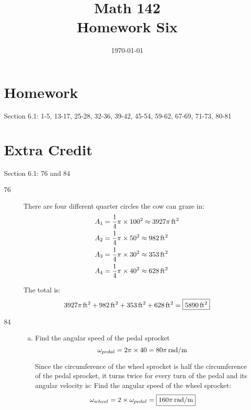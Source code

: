\documentclass{exam}
\author{}
\date{\today}
\title{Math 142 \\ Homework Six}
\begin{document}
  \maketitle

  \section{Homework}
  Section 6.1: 1-5, 13-17, 25-28, 32-36, 39-42, 45-54, 59-62, 67-69, 71-73, 80-81

  \section{Extra Credit}
  Section 6.1: 76 and 84

  \ifprintanswers

    \begin{description}
      \item[76]
        There are four different quarter circles the cow can graze in:
        \begin{align*}
          A_1 &= \frac{1}{4} \pi \times 100^2 \approx \unit[3927 \pi]{ft^2} \\
          A_2 &= \frac{1}{4} \pi \times 50^2 \approx \unit[982]{ft^2} \\
          A_3 &= \frac{1}{4} \pi \times 30^2 \approx \unit[353]{ft^2} \\
          A_4 &= \frac{1}{4} \pi \times 40^2 \approx \unit[628]{ft^2} \\
        \end{align*}

        The total is:
        \[
          \unit[3927 \pi]{ft^2} + \unit[982]{ft^2} + \unit[353]{ft^2} + \unit[628]{ft^2} = \boxed{ \unit[5890]{ft^2} }
        \]
        
      \item[84]
        \begin{enumerate}[(a)]

          \item 
            Find the angular speed of the pedal sprocket
            \[
              \omega_{pedal} = 2 \pi \times 40 = \unit[80 \pi]{rad/m}
            \]

            Since the circumference of the wheel sprocket is half the circumference of the pedal sprocket, it turns
            twice for every turn of the pedal and its angular velocity is:
            Find the angular speed of the wheel sprocket:
            \[
              \omega_{wheel} = 2 \times \omega_{pedal} = \boxed{ \unit[160 \pi]{rad/m} } 
            \]


\end{enumerate}
\end{description}
\end{document}
